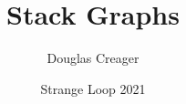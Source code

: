 \documentclass{beamer}
\title{Stack Graphs}
\author{Douglas Creager}
\institute{GitHub}
\date{Strange Loop 2021}
\begin{document}
\begin{frame}
    \titlepage
\end{frame}
\end{document}
